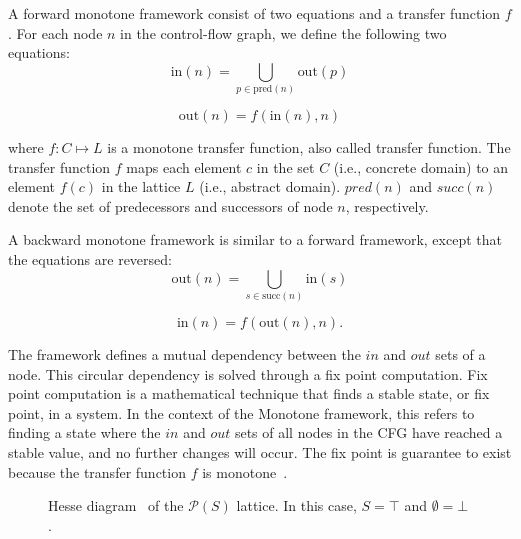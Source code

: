 A forward monotone framework consist of two equations and a transfer function $f$.
For each node $n$ in the control-flow graph, we define the following two equations:
$$\text{in}(n) = \bigcup\limits_{p \in \text{pred}(n)} \text{out}(p)$$

$$\text{out}(n) = f(\text{in}(n), n)$$

where $f:C \mapsto L$ is a monotone transfer function, also called transfer function. 
The transfer function $f$ maps each element $c$ in the set $C$ (i.e., concrete domain) 
to an element $f(c)$ in the lattice $L$ (i.e., abstract domain). $pred(n)$ and $succ(n)$ 
denote the set of predecessors and successors of node $n$, respectively.

A backward monotone framework is similar to a forward framework, except that the equations are reversed:
$$\text{out}(n) = \bigcup\limits_{s \in \text{succ}(n)} \text{in}(s)$$

$$\text{in}(n) = f(\text{out}(n), n).$$

The framework defines a mutual dependency between the $in$ and $out$ sets of a node.
This circular dependency is solved through a fix point computation.
Fix point computation is a mathematical technique that finds a stable 
state, or fix point, in a system. In the context of the Monotone framework, this 
refers to finding a state where the $in$ and $out$ sets of all nodes in the CFG have reached a 
stable value, and no further changes will occur. The fix point is guarantee to exist
because the transfer function $f$ is monotone~\cite{Knaster1929}.




\begin{figure}[h]
    \centering
{}
  \caption{\label{fig:lattice}Hesse diagram~\cite{Hesse1874} of the $\mathcal{P}(S)$ lattice.
  In this case, $S = \top$ and $\emptyset = \bot$.}
\end{figure}

